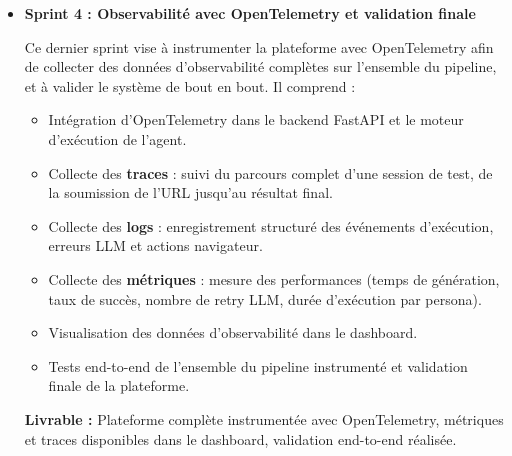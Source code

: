 \begin{itemize}
\begin{itemize}
    \item Intégration de \textit{crawl4ai} pour le crawl intelligent 
    du site cible : extraction structurée du contenu, rendu JavaScript, 
    conversion HTML vers Markdown.
    \item Enrichissement du contexte LLM : fourniture d'une description 
    précise des fonctionnalités, formulaires et flux du site pour 
    améliorer la qualité des personas générés.
    \item Gestion des sites débutant par une page de login : intégration 
    de Playwright (et Browser-Use pour les interfaces complexes) pour 
    effectuer l'authentification avant le crawl.
    \item Développement du serveur MCP custom : extraction du DOM 
    nettoyé, exécution de scripts Playwright autonomes.
    \item Optimisation de la compression des snapshots DOM pour 
    respecter les contraintes de taille du contexte LLM.
    \item Tests de régression sur les sites déjà validés pour vérifier 
    la non-régression après optimisation.
\end{itemize}

\textbf{Livrable :} Crawl intelligent opérationnel, gestion du login 
intégrée, qualité de génération des personas améliorée et mesurée.

\item \textbf{Sprint 4 : Observabilité avec OpenTelemetry et 
validation finale}

Ce dernier sprint vise à instrumenter la plateforme avec OpenTelemetry 
afin de collecter des données d'observabilité complètes sur l'ensemble 
du pipeline, et à valider le système de bout en bout. Il comprend :

\begin{itemize}
    \item Intégration d'OpenTelemetry dans le backend FastAPI et 
    le moteur d'exécution de l'agent.
    \item Collecte des \textbf{traces} : suivi du parcours complet 
    d'une session de test, de la soumission de l'URL jusqu'au 
    résultat final.
    \item Collecte des \textbf{logs} : enregistrement structuré des 
    événements d'exécution, erreurs LLM et actions navigateur.
    \item Collecte des \textbf{métriques} : mesure des performances 
    (temps de génération, taux de succès, nombre de retry LLM, 
    durée d'exécution par persona).
    \item Visualisation des données d'observabilité dans le dashboard.
    \item Tests end-to-end de l'ensemble du pipeline instrumenté et 
    validation finale de la plateforme.
\end{itemize}

\textbf{Livrable :} Plateforme complète instrumentée avec OpenTelemetry, 
métriques et traces disponibles dans le dashboard, validation 
end-to-end réalisée.

\end{itemize}

